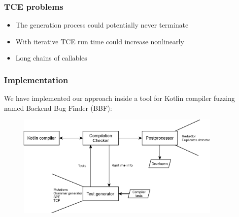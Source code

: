 \begin{frame}
	\frametitle{TCE problems}
	\begin{itemize}
		\item The generation process could potentially never terminate
		\item With iterative TCE run time could increase nonlinearly
		\item Long chains of callables
	\end{itemize}
\end{frame}


\begin{frame}
	\frametitle{Implementation}
We have implemented our approach inside a tool for Kotlin compiler fuzzing named Backend Bug Finder (BBF):
	\begin{figure}
		\includegraphics[width=100mm]{image/bbf_scheme}
	\end{figure}	
\end{frame}


